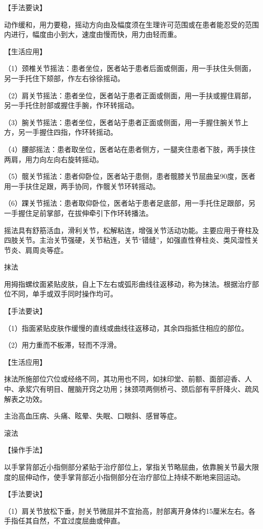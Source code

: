 \documentclass[12pt,UTF8]{ctexbook}
\begin{document}
【手法要诀】

动作缓和，用力要稳，摇动方向由及幅度须在生理许可范围或在患者能忍受的范围内进行，幅度由小到大，速度由慢而快，用力由轻而重。

【生活应用】

（1）颈椎关节摇法：患者坐位，医者站于患者后面或侧面，用一手扶住头侧面，另一手托住下颏部，作左右徐徐摇动。

（2）肩关节摇法：患者坐位，医者站于患者正面或侧面，用一手扶或握住肩部，另一手托住肘部或握住手腕，作环转摇动。

（3）腕关节摇法：患者坐位，医者站于患者正面或侧面，用一手握住腕关节上方，另一手握住四指，作环转摇动。

（4）腰部摇法：患者取坐位，医者站在患者侧方，一腿夹住患者下肢，两手挟住两肩，用力向左向右旋转摇动。

（5）髋关节摇法：患者仰卧位，医者站于患侧，患者髋膝关节屈曲呈90度，医者用一手扶住足跟，两手协同，作髋关节环转摇动。

（6）踝关节摇法：患者取仰卧位，医者站于患者足底部，用一手托住足跟部，另一手握住足前掌部，在拔伸牵引下作环转播法。

摇法具有舒筋活血，滑利关节，松解粘连，增强关节活动功能。主要应用于脊柱及四肢关节。主治关节强硬，关节粘连，关节“错缝”，如强直性脊柱炎、类风湿性关节炎、肩周炎等症。

抹法

用拇指螺纹面紧贴皮肤，自上下左右或弧形曲线往返移动，称为抹法。根据治疗部位不同，单手或双手同时操作均可。

【手法要诀】

（1）指面紧贴皮肤作缓慢的直线或曲线往返移动，其余四指抵住相应的部位。

（2）用力重而不板滞，轻而不浮滑。

【生活应用】

抹法所施部位穴位或经络不同，其功用也不同，如抹印堂、前额、面部迎香、人中、承浆穴有明目、醒脑开窍之功用；抹颈项两侧桥弓、颈后部有平肝降火、疏风解表之功效。

主治高血压病、头痛、眩晕、失眠、口眼斜、感冒等症。

滚法

【操作手法】

以手掌背部近小指侧部分紧贴于治疗部位上，掌指关节略屈曲，依靠腕关节最大限度的屈伸动作，使手掌背部近小指侧部分在治疗部位上持续不断地来回运动。

【手法要诀】

（1）肩关节放松下垂，肘关节微屈并不宜抬高，肘部离开身体约15厘米左右。各手指任其自然，不宜过度屈曲或伸直。
\end{document}
